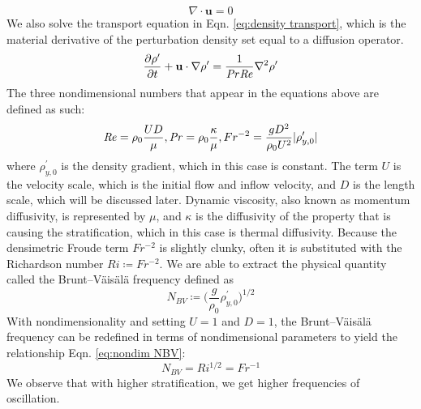 \begin{equation}
    \label{eq:cont}
    \nabla \cdot \textbf{u} = 0
\end{equation}
We also solve the transport equation in Eqn. \ref{eq:density transport}, which is the material derivative of the perturbation density set equal to a diffusion operator.  
\begin{equation}
    \label{eq:density transport}
    \frac{\partial\rho '}{\partial t}+\mathbf{u}\cdot\nabla\rho'=\frac{1}{\mathit{Pr} \mathit{Re}}\nabla^2\rho '
\end{equation}
The three nondimensional numbers that appear in the equations above are defined as such:
\[
    \mathit{Re} = \rho_0 \frac{U D}{\mu}, \mathit{Pr} = \rho_0 \frac{\kappa}{\mu}, Fr^{-2}=\frac{gD^2}{\rho_0 U^2}|\rho^{\prime}_{y,0}|
\]
where $\rho^{\prime}_{y,0}$ is the density gradient, which in this case is constant. The term $U$ is the velocity scale, which is the initial flow and inflow velocity, and $D$ is the length scale, which will be discussed later. Dynamic viscosity, also known as momentum diffusivity, is represented by $\mu$, and $\kappa$ is the diffusivity of the property that is causing the stratification, which in this case is thermal diffusivity. Because the densimetric Froude term $Fr^{-2}$ is slightly clunky, often it is substituted with the Richardson number $Ri \coloneqq Fr^{-2}$. We are able to extract the physical quantity called the Brunt–Väisälä frequency defined as
\begin{equation}
    \label{eq:NBV}
    N_{BV} \coloneqq \bigg( \frac{g}{\rho_0} \rho^{\prime}_{y,0} \bigg)^{1/2}    
\end{equation}
With nondimensionality and setting $U = 1$ and $D = 1$, the Brunt–Väisälä frequency can be redefined in terms of nondimensional parameters to yield the relationship Eqn. \ref{eq:nondim NBV}:
\begin{equation}
    \label{eq:nondim NBV}
    N_{BV} = Ri^{1/2} = Fr^{-1}
\end{equation}
We observe that with higher stratification, we get higher frequencies of oscillation.
 
